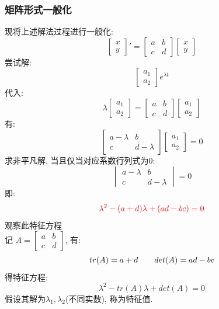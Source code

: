 \subsubsection{\large 矩阵形式一般化}
现将上述解法过程进行一般化:
\[
\begin{bmatrix}
    x \\
    y
\end{bmatrix}'
=
\begin{bmatrix}
    a & b \\
    c & d
\end{bmatrix}
\begin{bmatrix}
    x \\
    y
\end{bmatrix}
\]
尝试解:
\[
\begin{bmatrix}
    a_1 \\
    a_2
\end{bmatrix}
e^{\lambda t}
\]
代入:
\[
\lambda
\begin{bmatrix}
    a_1 \\
    a_2
\end{bmatrix}
=
\begin{bmatrix}
    a & b \\
    c & d
\end{bmatrix}
\begin{bmatrix}
    a_1 \\
    a_2
\end{bmatrix}
\]
有:
\[
\begin{bmatrix}
    a-\lambda & b \\
    c & d-\lambda
\end{bmatrix}
\begin{bmatrix}
    a_1 \\
    a_2
\end{bmatrix}
= 0
\]
求非平凡解, 当且仅当对应系数行列式为$0$:
\[
\begin{vmatrix}
    a-\lambda & b \\
    c & d-\lambda
\end{vmatrix}
= 0
\]
即:
\[
\textcolor{red}{\lambda^2 - (a+d)\lambda + (ad-bc) = 0}
\]
观察此特征方程\\
记
$A=
\begin{bmatrix}
    a & b \\
    c & d
\end{bmatrix}$, 有:
\[
tr(A)=a+d  \hspace*{2em} det(A)=ad-bc
\]
得特征方程:
\[
\lambda^2 - tr(A)\lambda + det(A) = 0
\]
假设其解为$\lambda_1, \lambda_2$(不同实数), 称为特征值.\\

